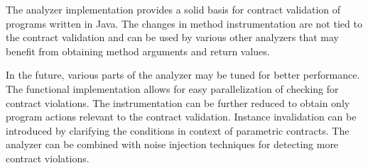 The analyzer implementation provides a solid basis for contract validation of
programs written in Java. The changes in method instrumentation are not tied to
the contract validation and can be used by various other analyzers that may
benefit from obtaining method arguments and return values.

In the future, various parts of the analyzer may be tuned for better
performance. The functional implementation allows for easy parallelization of
checking for contract violations. The instrumentation can be further reduced to
obtain only program actions relevant to the contract validation. Instance
invalidation can be introduced by clarifying the conditions in context of
parametric contracts. The analyzer can be combined with noise injection
techniques for detecting more contract violations.
